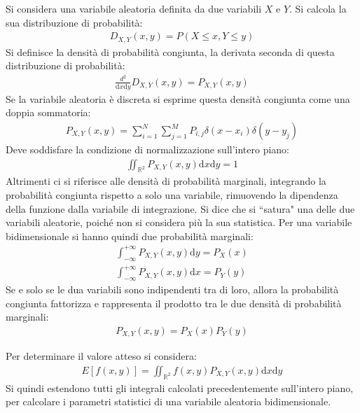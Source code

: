 \documentclass{article}
\newcommand{\df}{\mathrm{d}}
\numberwithin{equation}{subsection}
\begin{document}
Si considera una variabile aleatoria definita da due variabili $X$ e $Y$. Si calcola la sua distribuzione di probabilità:
\begin{gather*}
    D_{X,Y}(x,y)=P(X\leq x,Y\leq y)
\end{gather*}
Si definisce la densità di probabilità congiunta, la derivata seconda di questa distribuzione di probabilità:
\begin{gather*}
    \displaystyle\frac{d^2}{\df x\df y}D_{X,Y}(x,y)=P_{X,Y}(x,y)
\end{gather*}
Se la variabile aleatoria è discreta si esprime questa densità congiunta come una doppia sommatoria:
\begin{gather*}
    P_{X,Y}(x,y)=\displaystyle\sum_{i=1}^N\sum_{j=1}^MP_{i,j}\delta(x-x_i)\delta(y-y_j)
\end{gather*}
Deve soddisfare la condizione di normalizzazione sull'intero piano:
\begin{gather*}
    \iint_{\mathbb{R}^2}P_{X,Y}(x,y)\df x\df y=1
\end{gather*}
Altrimenti ci si riferisce alle densità di probabilità marginali, integrando la probabilità congiunta rispetto a solo una variabile, rimuovendo la dipendenza della funzione 
dalla variabile di integrazione. Si dice che si ``satura" una delle due variabili aleatorie, poiché non si considera più la sua statistica. Per una variabile 
bidimensionale si hanno quindi due probabilità marginali:
\begin{gather*}
    \displaystyle\int_{-\infty}^{+\infty}P_{X,Y}(x,y)\df y=P_X(x)\\
    \displaystyle\int_{-\infty}^{+\infty}P_{X,Y}(x,y)\df x=P_Y(y)
\end{gather*}
Se e solo se le dua variabili sono indipendenti tra di loro, allora la probabilità congiunta fattorizza e rappresenta il prodotto tra le due densità di probabilità marginali:
\begin{gather*}
    P_{X,Y}(x,y)=P_X(x)P_Y(y)
\end{gather*}

Per determinare il valore atteso si considera:
\begin{gather*}
    E[f(x,y)]=\displaystyle\iint_{\mathbb{R}^2}f(x,y)P_{X,Y}(x,y)\df x\df y
\end{gather*}
Si quindi estendono tutti gli integrali calcolati precedentemente sull'intero piano, per calcolare i parametri statistici di una variabile aleatoria bidimensionale. 
\end{document}
